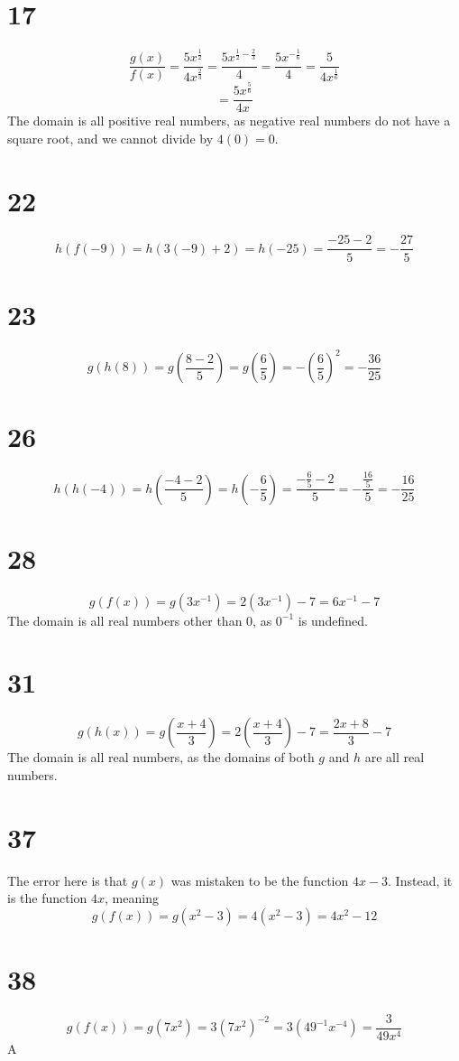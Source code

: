 \documentclass{article}
\theoremstyle{definition}
\begin{document}
\section*{17}
\[ \frac{g(x)}{f(x)}=\frac{5x^\frac{1}{2}}{4x^\frac{2}{3}}=\frac{5x^{\frac{1}{2}-\frac{2}{3}}}{4}=\frac{5x^{-\frac{1}{6}}}{4}=\frac{5}{4x^\frac{1}{6}} \]
\[ =\frac{5x^\frac{5}{6}}{4x} \]
The domain is all positive real numbers, as negative real numbers do not have a square root, and we cannot divide by $4(0)=0$.

\section*{22}
\[ h(f(-9))=h(3(-9)+2)=h(-25)=\frac{-25-2}{5}=-\frac{27}{5} \]

\section*{23}
\[ g(h(8))=g(\frac{8-2}{5})=g(\frac{6}{5})=-(\frac{6}{5})^2=-\frac{36}{25} \]

\section*{26}
\[ h(h(-4))=h(\frac{-4-2}{5})=h(-\frac{6}{5})=\frac{-\frac{6}{5}-2}{5}=-\frac{\frac{16}{5}}{5}=-\frac{16}{25} \]

\section*{28}
\[ g(f(x))=g(3x^{-1})=2(3x^{-1})-7=6x^{-1}-7 \]
The domain is all real numbers other than $0$, as $0^{-1}$ is undefined.

\section*{31}
\[ g(h(x))=g(\frac{x+4}{3})=2(\frac{x+4}{3})-7=\frac{2x+8}{3}-7 \]
The domain is all real numbers, as the domains of both $g$ and $h$ are all real numbers.

\section*{37}
The error here is that $g(x)$ was mistaken to be the function $4x-3$. Instead, it is the function $4x$, meaning 
\[ g(f(x))=g(x^2-3)=4(x^2-3)=4x^2-12 \]

\section*{38}
\[ g(f(x))=g(7x^2)=3(7x^2)^{-2}=3(49^{-1}x^{-4})=\frac{3}{49x^4} \]
A
\end{document}
